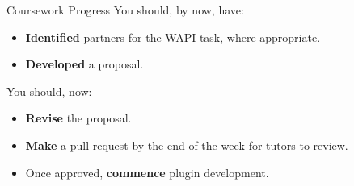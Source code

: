 \documentclass[xcolor={dvipsnames}]{beamer}\usepackage{etoolbox}\newtoggle{printable}\togglefalse{printable}
\begin{document}
\begin{frame}{Coursework Progress}
You should, by now, have:

	\begin{itemize}
		\item \textbf{Identified} partners for the WAPI task, where appropriate.
		\item \textbf{Developed} a proposal. 
	\end{itemize}
	
You should, now:

	\begin{itemize}
		\item \textbf{Revise} the proposal.
		\item \textbf{Make} a pull request by the end of the week for tutors to review. 
		\item Once approved, \textbf{commence} plugin development. 
	\end{itemize}
\end{frame}


%
\end{document}
